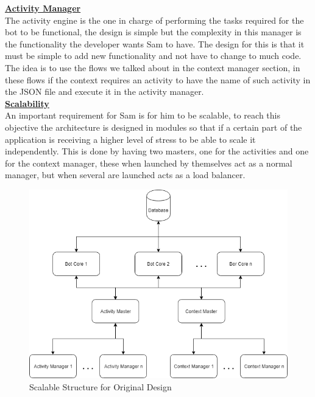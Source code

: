 \clearpage
\textbf{\underline{Activity Manager}}\label{sec:chap4_ori_act_man}\\

The activity engine is the one in charge of performing the tasks required for the bot to be functional, the design is simple but the complexity in this manager is the functionality the developer wants Sam to have. The design for this is that it must be simple to add new functionality and not have to change to much code. The idea is to use the flows we talked about in the context manager section, in these flows if the context requires an activity to have the name of such activity in the JSON file and execute it in the activity manager.\\


\textbf{\underline{Scalability}}\label{sec:chap4_ori_scale}\\

An important requirement for Sam is for him to be scalable, to reach this objective the architecture is designed in modules so that if a certain part of the application is receiving a higher level of stress to be able to scale it independently. This is done by having two masters, one for the activities and one for the context manager, these when launched by themselves act as a normal manager, but when several are launched acts as a load balancer.

\begin{center}
	\begin{figure}[h!]
		\centering
		\includegraphics[scale=0.65]{./images/4-des-scal}
		\caption{Scalable Structure for Original Design}
		\label{4_des_scal}
	\end{figure}
\end{center}

